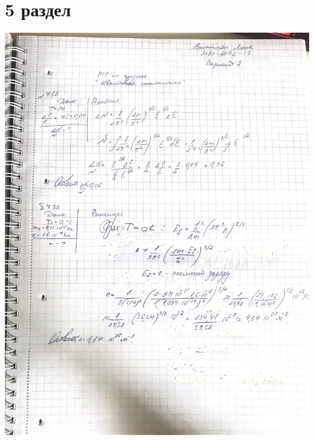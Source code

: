 \documentclass[12pt]{article}
\begin{document}
\section{5 раздел}
\begin{center}
\includegraphics[scale=0.18]{5_1.jpeg}\\
\vfill

\end{center}
\end{document}
